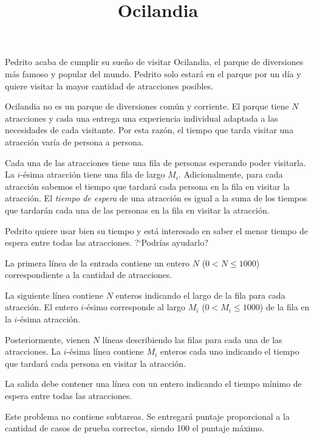 \documentclass{oci}
\title{Ocilandia}
\begin{document}
\begin{problemDescription}
  Pedrito acaba de cumplir su sueño de visitar Ocilandia, el parque de diversiones más famoso y
  popular del mundo.
  Pedrito solo estará en el parque por un día y quiere visitar la mayor cantidad de atracciones
  posibles.

  Ocilandia no es un parque de diversiones común y corriente.
  El parque tiene $N$ atracciones y cada una entrega una experiencia individual adaptada a
  las necesidades de cada visitante.
  Por esta razón, el tiempo que tarda visitar una atracción varía de persona a persona.

  Cada una de las atracciones tiene una fila de personas esperando poder visitarla.
  La $i$-ésima atracción tiene una fila de largo $M_i$.
  Adicionalmente, para cada atracción sabemos el tiempo que tardará cada persona en la fila en
  visitar la atracción.
  El \emph{tiempo de espera} de una atracción es igual a la suma de los tiempos que tardarán
  cada una de las personas en la fila en visitar la atracción.

  Pedrito quiere usar bien su tiempo y está interesado en saber el menor tiempo de espera entre
  todas las atracciones.
  ?`Podrías ayudarlo?
\end{problemDescription}

\begin{inputDescription}
  La primera línea de la entrada contiene un entero $N$ ($0 < N \leq 1000$) correspondiente a la
  cantidad de atracciones.

  La siguiente línea contiene $N$ enteros indicando el largo de la fila para cada atracción.
  El entero $i$-ésimo corresponde al largo $M_i$ ($0 < M_i \leq 1000$) de la fila en la $i$-ésima atracción.

  Posteriormente, vienen $N$ líneas describiendo las filas para cada una de las atracciones.
  La $i$-ésima línea contiene $M_i$ enteros cada uno indicando el tiempo que tardará cada persona
  en visitar la atracción.
\end{inputDescription}

\begin{outputDescription}
  La salida debe contener una línea con un entero indicando el tiempo mínimo de espera entre todas
  las atracciones.
\end{outputDescription}

\begin{scoreDescription}
  Este problema no contiene subtareas.
  Se entregará puntaje proporcional a la cantidad de casos de prueba correctos,
  siendo 100 el puntaje máximo.
\end{scoreDescription}

\begin{sampleDescription}
\end{sampleDescription}
\end{document}
